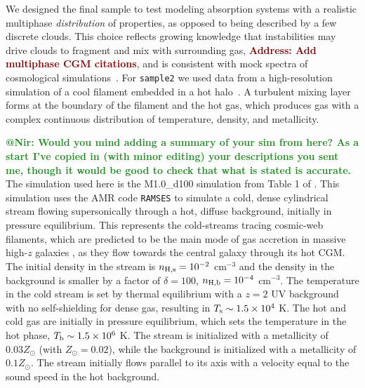 \documentclass[fleqn,usenatbib]{mnras}
\makeatletter
\newcommand{\todo}[1]{\textcolor{Maroon}{\textbf{Address: #1}}}
\newcommand{\atnir}[1]{\textcolor{ForestGreen}{\textbf{@Nir: #1}}}
\makeatother
\begin{document}
We designed the final sample to test modeling absorption systems with a realistic multiphase \textit{distribution} of properties, as opposed to being described by a few discrete clouds.
This choice reflects growing knowledge that instabilities may drive clouds to fragment and mix with surrounding gas, \todo{Add multiphase CGM citations}, and is consistent with mock spectra of cosmological simulations~\citep[e.g.][]{Marra2022}.
For \texttt{sample2} we used data from a high-resolution simulation of a cool filament embedded in a hot halo~\citep{Mandelker2020a}.
A turbulent mixing layer forms at the boundary of the filament and the hot gas, which produces gas with a complex continuous distribution of temperature, density, and metallicity.

\atnir{Would you mind adding a summary of your sim from \cite{Mandelker2020a} here? As a start I've copied in (with minor editing) your descriptions you sent me, though it would be good to check that what is stated is accurate.}
The simulation used here is the M1.0\_d100 simulation from Table 1 of \cite{Mandelker2020a}.
This simulation uses the AMR code \texttt{RAMSES} \citep{Teyssier02} to simulate a cold, dense cylindrical stream flowing supersonically through a hot, diffuse background, initially in pressure equilibrium.
This represents the cold-streams tracing cosmic-web filaments, which are predicted to be the main mode of gas accretion in massive high-$z$ galaxies \citep{Dekel09}, as they flow towards the central galaxy through its hot CGM.
The initial density in the stream is $n_{\rm H,s}=10^{-2}$ cm$^{-3}$ and the density in the background is smaller by a factor of $\delta=100$, $n_{\rm H,b}=10^{-4}$ cm$^{-3}$.
The temperature in the cold stream is set by thermal equilibrium with a $z=2$ \cite{Haardt1996} UV background with no self-shielding for dense gas, resulting in $T_{\rm s}\sim 1.5 \times 10^4$ K.
The hot and cold gas are initially in pressure equilibrium, which sets the temperature in the hot phase, $T_{\rm b}\sim 1.5 \times 10^6$ K.
The stream is initialized with a metallicity of $0.03 Z_\odot$ (with $Z_\odot = 0.02$), while the background is initialized with a metallicity of $0.1 Z_\odot$.
The stream initially flows parallel to its axis with a velocity equal to the sound speed in the hot background.
\end{document}
